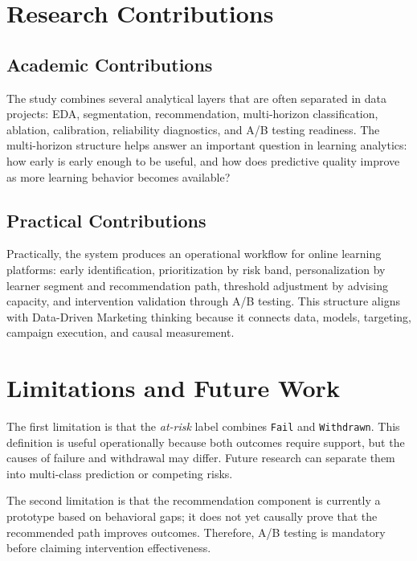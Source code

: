 \documentclass[conference]{IEEEtran}
\newcommand{\risk}{\textit{at-risk}}
\begin{document}
\section{Research Contributions}

\subsection{Academic Contributions}

The study combines several analytical layers that are often separated in data projects: EDA, segmentation, recommendation, multi-horizon classification, ablation, calibration, reliability diagnostics, and A/B testing readiness. The multi-horizon structure helps answer an important question in learning analytics: how early is early enough to be useful, and how does predictive quality improve as more learning behavior becomes available?

\subsection{Practical Contributions}

Practically, the system produces an operational workflow for online learning platforms: early identification, prioritization by risk band, personalization by learner segment and recommendation path, threshold adjustment by advising capacity, and intervention validation through A/B testing. This structure aligns with Data-Driven Marketing thinking because it connects data, models, targeting, campaign execution, and causal measurement.

\section{Limitations and Future Work}

The first limitation is that the \risk{} label combines \texttt{Fail} and \texttt{Withdrawn}. This definition is useful operationally because both outcomes require support, but the causes of failure and withdrawal may differ. Future research can separate them into multi-class prediction or competing risks.

The second limitation is that the recommendation component is currently a prototype based on behavioral gaps; it does not yet causally prove that the recommended path improves outcomes. Therefore, A/B testing is mandatory before claiming intervention effectiveness.
\end{document}
